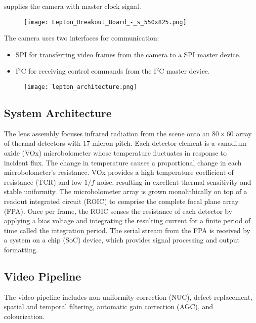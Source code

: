supplies the camera with master clock signal.\cite{breakoutboard}
%
\begin{figure}[!htb]
    \centering
    \texttt{[image: Lepton\_Breakout\_Board\_-\_s\_550x825.png]}
    \label{fig:breakoutboard}
 \end{figure}
\linebreak The camera uses two interfaces for communication:
\begin{itemize}
    \item SPI for transferring video frames from the camera to a SPI master
device.
    \item I$^{2}$C for receiving control commands from the I$^{2}$C master
device.
\end{itemize}
%
\begin{figure}[htb]
    \centering
    \texttt{[image: lepton\_architecture.png]}
    \label{fig:leptonarchitecture}
\end{figure}
%
\subsection{System Architecture}
\label{ssec:leptonarchitecture}
The lens assembly focuses infrared radiation from the scene onto an $80 \times
60$ array of thermal detectors with 17-micron pitch. Each detector element is a
vanadium-oxide (VOx) microbolometer whose temperature fluctuates in response to
incident flux. The change in temperature causes a proportional change in each
microbolometer’s resistance. VOx provides a high temperature coefficient of
resistance (TCR) and low $1/f$ noise, resulting in excellent thermal sensitivity
and stable uniformity. The microbolometer array is grown monolithically on top
of a readout integrated circuit (ROIC) to comprise the complete focal plane
array (FPA). Once per frame, the ROIC senses the resistance of each detector by
applying a bias voltage and integrating the resulting current for a finite
period of time called the integration period. The serial stream from the FPA is
received by a system on a chip (SoC) device, which provides signal processing
and output formatting.
%
\subsection{Video Pipeline}
\label{ssec:pipeline}
The video pipeline includes non-uniformity correction (NUC), defect replacement,
spatial and temporal filtering, automatic gain correction (AGC), and
colourization.
%
\begin{figure}[!h]
    \centering
    \resizebox{0.65\textwidth}{!}{}
    \label{fig:videopipe}
\end{figure}
